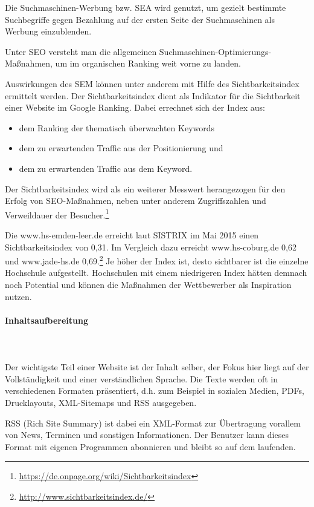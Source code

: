 Die Suchmaschinen-Werbung bzw. SEA wird genutzt, um gezielt bestimmte Suchbegriffe gegen Bezahlung auf der ersten Seite der Suchmaschinen als Werbung einzublenden.

Unter SEO versteht man die allgemeinen Suchmaschinen-Optimierungs-Maßnahmen, um im organischen Ranking weit vorne zu landen.

Auswirkungen des SEM können unter anderem mit Hilfe des Sichtbarkeitsindex ermittelt werden. Der Sichtbarkeitsindex dient als Indikator für die Sichtbarkeit einer Website im Google Ranking. Dabei errechnet sich der Index aus:

\begin{itemize}
	\item dem Ranking der thematisch überwachten Keywords
	\item dem zu erwartenden Traffic aus der Positionierung und
	\item dem zu erwartenden Traffic aus dem Keyword.
\end{itemize}

Der Sichtbarkeitsindex wird als ein weiterer Messwert herangezogen für den Erfolg von SEO-Maßnahmen, neben unter anderem Zugriffszahlen und Verweildauer der Besucher.\footnote{\url{https://de.onpage.org/wiki/Sichtbarkeitsindex}}

Die www.hs-emden-leer.de erreicht laut SISTRIX im Mai 2015 einen Sichtbarkeitsindex von 0,31. Im Vergleich dazu erreicht www.hs-coburg.de 0,62 und www.jade-hs.de 0,69.\footnote{\url{http://www.sichtbarkeitsindex.de/}} Je höher der Index ist, desto sichtbarer ist die einzelne Hochschule aufgestellt. Hochschulen mit einem niedrigeren Index hätten demnach noch Potential und können die Maßnahmen der Wettbewerber als Inspiration nutzen.

\paragraph{Inhaltsaufbereitung}\mbox{}\\\\
Der wichtigste Teil einer Website ist der Inhalt selber, der Fokus hier liegt auf der Vollständigkeit und einer verständlichen Sprache. Die Texte werden oft in verschiedenen Formaten präsentiert, d.h. zum Beispiel in sozialen Medien, PDFs, Drucklayouts, XML-Sitemaps und RSS ausgegeben.

RSS (Rich Site Summary) ist dabei ein XML-Format zur Übertragung vorallem von News, Terminen und sonstigen Informationen. Der Benutzer kann dieses Format mit eigenen Programmen abonnieren und bleibt so auf dem laufenden.




